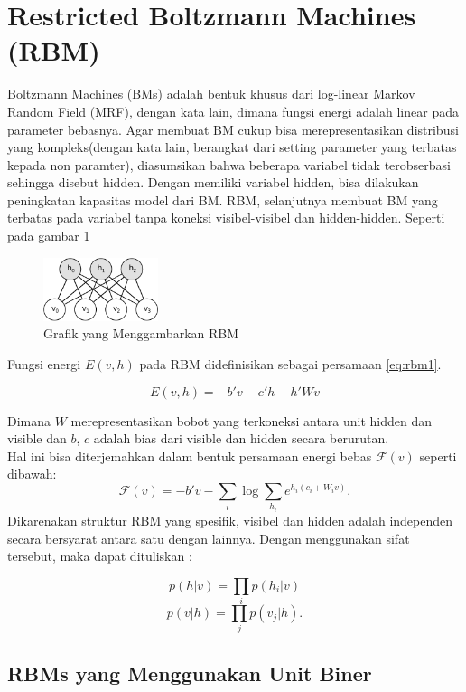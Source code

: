 \documentclass[12pt]{article}
\begin{document}
\section{Restricted Boltzmann Machines (RBM)}
Boltzmann Machines (BMs) adalah bentuk khusus dari log-linear Markov Random Field (MRF), dengan kata lain, dimana fungsi energi adalah linear pada parameter bebasnya. Agar membuat BM cukup bisa merepresentasikan distribusi yang kompleks(dengan kata lain, berangkat dari setting parameter yang terbatas kepada non paramter), diasumsikan bahwa beberapa variabel tidak terobserbasi sehingga disebut hidden. Dengan memiliki variabel hidden, bisa dilakukan peningkatan kapasitas model dari BM. RBM, selanjutnya membuat BM yang terbatas pada variabel tanpa koneksi visibel-visibel dan hidden-hidden. Seperti pada gambar \ref{fig:rbm}\\
\begin{figure}
	\centering
	\includegraphics[width=0.3\textwidth]
		{pics/rbm.png}
	\caption{Grafik yang Menggambarkan RBM}
	\label{fig:rbm}
\end{figure}

Fungsi energi $E(v,h)$ pada RBM didefinisikan sebagai persamaan \ref{eq:rbm1}.

\begin{equation}
E(v,h) = - b'v - c'h - h'Wv
\label{eq:rbm1}
\end{equation}

Dimana $W$ merepresentasikan bobot yang terkoneksi antara unit hidden dan visible dan $b$, $c$ adalah bias dari visible dan hidden secara berurutan.\\

Hal ini bisa diterjemahkan dalam bentuk persamaan energi bebas $\mathcal{F}(v)$ seperti dibawah:
\[\mathcal{F}(v)= - b'v - \sum_i \log \sum_{h_i} e^{h_i (c_i + W_i v)}.\]
Dikarenakan struktur RBM yang spesifik, visibel dan hidden adalah independen secara bersyarat antara satu dengan lainnya. Dengan menggunakan sifat tersebut, maka dapat dituliskan :

\[p(h|v) = \prod_i p(h_i|v)\]
\[p(v|h) = \prod_j p(v_j|h).\]

\subsection{RBMs yang Menggunakan Unit Biner}
\end{document}
